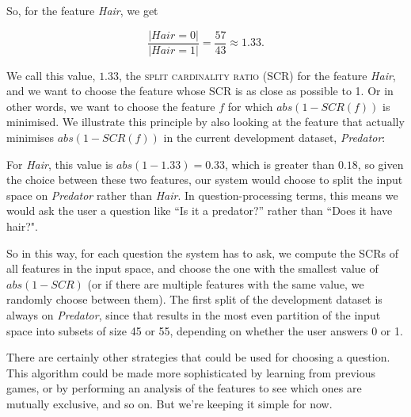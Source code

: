 \documentclass[a4paper,12pt]{article}
\begin{document}
So, for the feature \textit{Hair}, we get

$$\frac{|Hair = 0|}{|Hair = 1|} = \frac{57}{43} \approx 1.33.$$

We call this value, $1.33$, the \textsc{split cardinality ratio} (SCR) for the feature \textit{Hair}, and we want to choose the feature whose SCR is as close as possible to 1.
Or in other words, we want to choose the feature $f$ for which $abs(1 - SCR(f))$ is minimised.
We illustrate this principle by also looking at the feature that actually minimises  $abs(1 - SCR(f))$ in the current development dataset, \textit{Predator}:


For \textit{Hair}, this value is $abs(1 - 1.33) = 0.33$, which is greater than $0.18$, so given the choice between these two features, our system would choose to split the input space on \textit{Predator} rather than \textit{Hair}.
In question-processing terms, this means we would ask the user a question like ``Is it a predator?'' rather than ``Does it have hair?".

So in this way, for each question the system has to ask, we compute the SCRs of all features in the input space, and choose the one with the smallest value of $abs(1 - SCR)$ (or if there are multiple features with the same value, we randomly choose between them).
The first split of the development dataset is always on \textit{Predator}, since that results in the most even partition of the input space into subsets of size 45 or 55, depending on whether the user answers 0 or 1.

There are certainly other strategies that could be used for choosing a question.
This algorithm could be made more sophisticated by learning from previous games, or by performing an analysis of the features to see which ones are mutually exclusive, and so on.
But we're keeping it simple for now.
\end{document}

